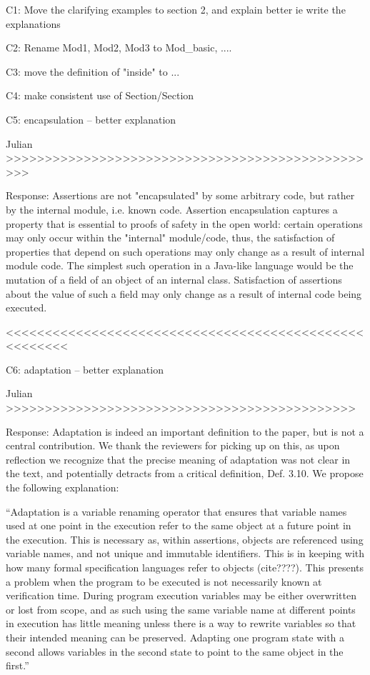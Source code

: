 C1: Move the clarifying examples to section 2, and explain better
ie write the explanations

C2: Rename Mod1, Mod2, Mod3 to Mod_{basic}, ....

C3: move the definition of "inside" to ...

C4: make consistent use of Section/Section

C5: encapsulation -- better explanation

Julian >>>>>>>>>>>>>>>>>>>>>>>>>>>>>>>>>>>>>>>>>>>>>>>>>

Response:
Assertions are not "encapsulated" by some arbitrary code, but rather by the internal module, i.e. known code. Assertion encapsulation captures a property that is essential to proofs of safety in the open world: certain operations may only occur within the "internal" module/code, thus, the satisfaction of properties that depend on such operations may only change as a result of internal module code. The simplest such operation in a Java-like language would be the mutation of a field of an object of an internal class. Satisfaction of assertions about the value of such a field may only change as a result of internal code being executed.

<<<<<<<<<<<<<<<<<<<<<<<<<<<<<<<<<<<<<<<<<<<<<<<<<<<<<<

C6: adaptation -- better explanation

Julian >>>>>>>>>>>>>>>>>>>>>>>>>>>>>>>>>>>>>>>>>>>>>

Response:
Adaptation is indeed an important definition to the paper, but is not a central contribution. We thank the reviewers for picking up on this, as upon reflection we recognize that the precise meaning of adaptation was not clear in the text, and potentially detracts from a critical definition, Def. 3.10. We propose the following explanation:

``Adaptation is a variable renaming operator that ensures that variable names used at one point in the execution refer to the same object at a future point in the execution. This is necessary as, within assertions, objects are referenced using variable names, and not unique and immutable identifiers. This is in keeping with how many formal specification languages refer to objects (cite????). This presents a problem when the program to be executed is not necessarily known at verification time. During program execution variables may be either overwritten or lost from scope, and as such using the same variable name at different points in execution has little meaning unless there is a way to rewrite variables so that their intended meaning can be preserved. Adapting one program state with a second allows variables in the second state to point to the same object in the first.''

